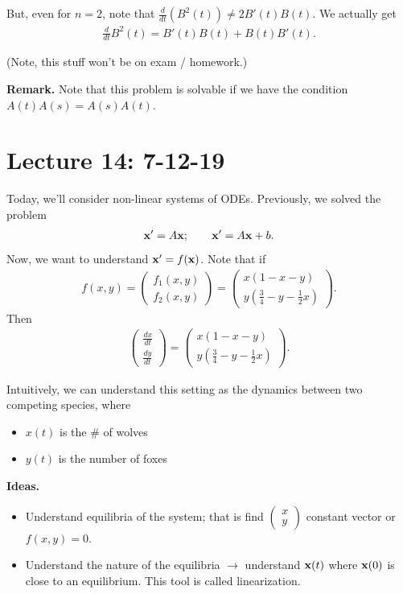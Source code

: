 \documentclass{article}
\newcommand{\mat}[1]{\begin{pmatrix}#1\end{pmatrix}}
\begin{document}
But, even for $n = 2$, note that $\frac{d}{dt} (B^2(t)) \neq 2 B'(t) B(t)$.  We actually get
\begin{align*}
  \frac{d}{dt} B^2(t) = B'(t) B(t) + B(t) B'(t).
\end{align*}

(Note, this stuff won't be on exam / homework.)

{\bf Remark.} Note that this problem is solvable if we have the condition $A(t) A(s) = A(s) A(t)$.

\section{Lecture 14: 7-12-19}

Today, we'll consider non-linear systems of ODEs.  Previously, we solved the problem
\begin{align*}
  \mathbf{x}' = A \mathbf{x}; \qquad \mathbf{x}' = A \mathbf{x} + b.
\end{align*}
Now, we want to understand $\mathbf{x}' = f (\mathbf{x})$.  Note that if
\begin{align*}
  f(x, y) = \mat{f_1(x, y) \\ f_2(x, y)} = \mat{x(1 - x - y) \\ y(\frac{3}{4} - y - \frac{1}{2}x)}.
\end{align*}
Then
\begin{align*}
  \mat{\frac{dx}{dt} \\ \frac{dy}{dt}} = \mat{x(1 - x - y) \\ y(\frac{3}{4} - y - \frac{1}{2}x)}.
\end{align*}

Intuitively, we can understand this setting as the dynamics between two competing species, where
\begin{itemize}
  \item $x(t)$ is the # of wolves
  \item $y(t)$ is the number of foxes
\end{itemize}

{\bf Ideas.}

\begin{itemize}
  \item Understand equilibria of the system; that is find $\mat{x \\ y}$ constant vector or $f(x, y) = 0$.
  \item Understand the nature of the equilibria $\to$ understand $\mathbf{x}(t)$ where $\mathbf{x}(0)$ is close to an equilibrium.  This tool is called linearization.
\end{itemize}
\end{document}
